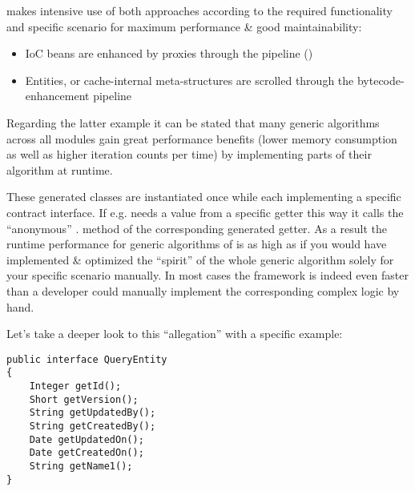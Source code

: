 \AMBETH{} makes intensive use of both approaches according to the required functionality and specific scenario for maximum performance \& good maintainability:
\begin{itemize}
	\item IoC beans are enhanced by proxies through the  pipeline ()
	\item Entities,  or cache-internal meta-structures are scrolled through the bytecode-enhancement pipeline
\end{itemize}
Regarding the latter example it can be stated that many generic algorithms across all modules gain great performance benefits (lower memory consumption as well as higher iteration counts per time) by implementing parts of their algorithm at runtime.


These generated classes are instantiated once while each implementing a specific contract interface. If \AMBETH{} e.g. needs a value from a specific getter this way it calls the ``anonymous'' . method of the corresponding generated getter. As a result the runtime performance for generic algorithms of \AMBETH{} is as high as if you would have implemented \& optimized the ``spirit'' of the whole generic algorithm solely for your specific scenario manually. In most cases the framework is indeed even faster than a developer could manually implement the corresponding complex logic by hand.

Let's take a deeper look to this ``allegation'' with a specific example:
\begin{lstlisting}[style=Java,caption={Example entity definition (Java)}]
public interface QueryEntity
{
	Integer getId();
	Short getVersion();
	String getUpdatedBy();
	String getCreatedBy();
	Date getUpdatedOn();
	Date getCreatedOn();
	String getName1();
}
\end{lstlisting}

